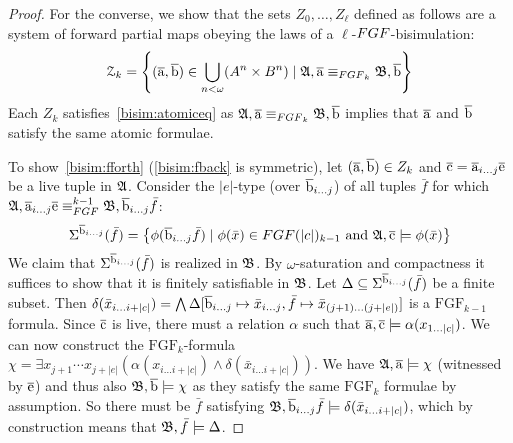 \begin{proof}
  For the converse, we show that the sets $Z_{0}, \ldots, Z_{\ell}$ defined as follows are a system of forward partial maps obeying the laws of a $\ell$-$\FGF$-bisimulation:
  \begin{equation*}
  \mathcal{Z}_{k} = \left\{ (\elemtuplea, \elemtupleb) \in \bigcup_{n < \omega} (A^{n} \times B^{n}) \mid \str{A}, \elemtuplea \equiv_{\FGF_{k}} \str{B},\elemtupleb \right\}
  \end{equation*}
  Each $Z_{k}$ satisfies~\ref{bisim:atomiceq} as $\str{A}, \elemtuplea \equiv_{\FGF_{k}} \str{B},\elemtupleb$ implies that $\overline{\mathrm{a}}$ and $\overline{\mathrm{b}}$ satisfy the same atomic formulae.

  To show~\ref{bisim:fforth} (\ref{bisim:fback} is symmetric), let $(\overline{\mathrm{a}}, \overline{\mathrm{b}}) \in Z_{k}$ and $\overline{\mathrm{c}} = \overline{\mathrm{a}}_{i\ldots{}j}\overline{\mathrm{e}}$ be a live tuple in ${\mathfrak{A}}$.
  Consider the $|e|$-type (over $\overline{\mathrm{b}}_{i\ldots{}j}$) of all tuples $\bar{f}$ for which $\str{A}, \elemtuplea_{i\ldots{}j}\elemtuplee \equiv_{\FGF}^{k-1} \str{B}, \elemtupleb_{i\ldots{j}}\bar{f}$:
  \begin{align*}
    \Sigma^{\elemtupleb_{i\ldots{j}}}(\bar{f}) = \left\{ \phi(\elemtupleb_{i\ldots{}j}\bar{f}) \mid \phi(\bar{x}) \in {\FGF(|c|)_{k-1}}\ \text{and}\ \str{A}, \elemtuplec \models \phi(\bar{x}) \right\}
  \end{align*}
  We claim that $\Sigma^{\overline{\mathrm{b}}_{i\ldots{}j}}(\bar{f})$ is realized in ${\mathfrak{B}}$.
  By $\omega$-saturation and compactness it suffices to show that it is finitely satisfiable in ${\mathfrak{B}}$.
  Let $\Delta \subseteq \Sigma^{\overline{\mathrm{b}}_{i\ldots{}j}}(\bar{f})$ be a finite subset.
  Then $\delta(\bar{x}_{i\ldots{}i+|c|}) = \bigwedge \Delta[\overline{\mathrm{b}}_{i\ldots{}j} \mapsto \bar{x}_{i\ldots{}j}, \bar{f} \mapsto \bar{x}_{(j+1)\ldots{}(j+|e|)}]$ is a $\mathrm{FGF}_{k-1}$ formula.
  Since $\overline{\mathrm{c}}$ is live, there must a relation $\alpha$ such that $\overline{\mathrm{a}}, \overline{\mathrm{c}} \models \alpha(x_{1\ldots{}|c|})$.
  We can now construct the $\mathrm{FGF}_{k}$-formula $\chi = \exists{x_{j+1}\cdots{}x_{j+|e|}} (\alpha(x_{i\ldots{}i+|c|}) \land \delta(\bar{x}_{i\ldots{}i+|c|}))$.
  We have ${\mathfrak{A}}, \overline{\mathrm{a}} \models \chi$ (witnessed by $\overline{\mathrm{e}}$) and thus also ${\mathfrak{B}}, \overline{\mathrm{b}} \models \chi$ as they satisfy the same $\mathrm{FGF}_{k}$ formulae by assumption.
  So there must be $\bar{f}$ satisfying ${\mathfrak{B}}, \overline{\mathrm{b}}_{i\ldots{}j}\bar{f} \models \delta(\bar{x}_{i\ldots{}i+|c|})$, which by construction means that ${\mathfrak{B}}, \bar{f} \models \Delta$.
\end{proof}


